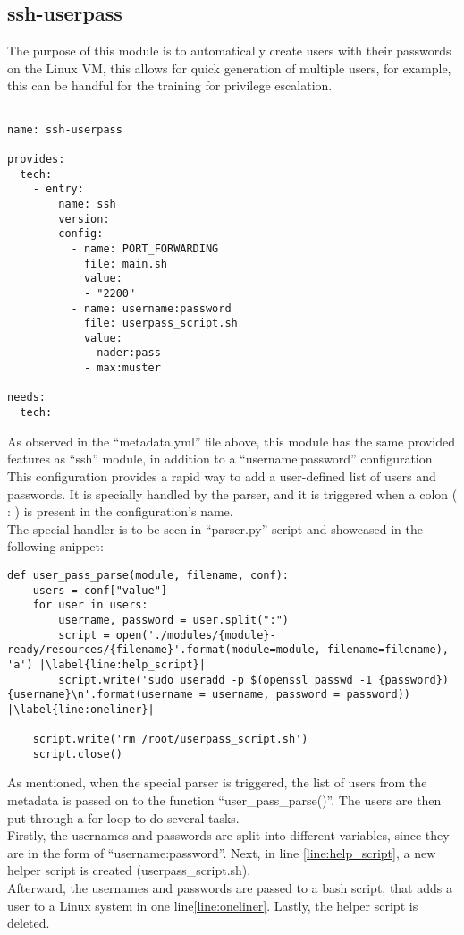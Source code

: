 \clearpage

\subsection{ssh-userpass}
The purpose of this module is to automatically create users with their passwords on the Linux VM, this allows for quick generation of multiple users, for example, this can be handful for the training for privilege escalation.

\begin{lstlisting}[caption=ssh-userpass metadata, style=pythonstyle]
---
name: ssh-userpass

provides:
  tech:
    - entry:
        name: ssh
        version:
        config:
          - name: PORT_FORWARDING
            file: main.sh
            value:
            - "2200"
          - name: username:password
            file: userpass_script.sh
            value:
            - nader:pass
            - max:muster

needs:
  tech:
\end{lstlisting}

As observed in the “metadata.yml” file above, this module has the same provided features as “ssh” module, in addition to a “username:password” configuration.\\
This configuration provides a rapid way to add a user-defined list of users and passwords. It is specially handled by the parser, and it is triggered when a colon ( : ) is present in the configuration’s name.\\
The special handler is to be seen in “parser.py” script and showcased in the following snippet:


\begin{lstlisting}[caption=ssh-userpass parsing, style=pythonstyle, escapechar=|]
def user_pass_parse(module, filename, conf):
    users = conf["value"]
    for user in users:
        username, password = user.split(":")
        script = open('./modules/{module}-ready/resources/{filename}'.format(module=module, filename=filename), 'a') |\label{line:help_script}|
        script.write('sudo useradd -p $(openssl passwd -1 {password}) {username}\n'.format(username = username, password = password)) |\label{line:oneliner}|

    script.write('rm /root/userpass_script.sh')
    script.close()
\end{lstlisting}

As mentioned, when the special parser is triggered, the list of users from the metadata is passed on to the function “user\_pass\_parse()”. The users are then put through a for loop to do several tasks.\\
Firstly, the usernames and passwords are split into different variables, since they are in the form of “username:password”. Next, in line \ref{line:help_script}, a new helper script is created (userpass\_script.sh).\\
Afterward, the usernames and passwords are passed to a bash script, that adds a user to a Linux system in one line\ref{line:oneliner}. Lastly, the helper script is deleted.\\

